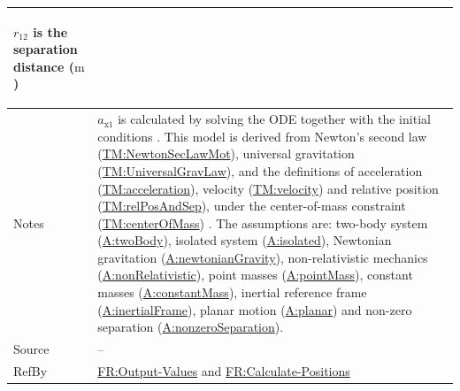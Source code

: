\documentclass[12pt]{article}
\begin{document}
\begin{minipage}{\textwidth}
\begin{tabular}{>{\raggedright}p{}>{\raggedright\arraybackslash}p{}}
\begin{symbDescription}
              \item{${r_{12}}$ is the separation distance (${\text{m}}$)}
              \end{symbDescription}
\\ \midrule
Notes & ${a_{\text{x}1}}$ is calculated by solving the ODE together with the initial conditions . This model is derived from Newton's second law (\hyperref[TM:NewtonSecLawMot]{TM:NewtonSecLawMot}), universal gravitation (\hyperref[TM:UniversalGravLaw]{TM:UniversalGravLaw}), and the definitions of acceleration (\hyperref[TM:acceleration]{TM:acceleration}), velocity (\hyperref[TM:velocity]{TM:velocity}) and relative position (\hyperref[TM:relPosAndSep]{TM:relPosAndSep}), under the center-of-mass constraint (\hyperref[TM:centerOfMass]{TM:centerOfMass}) . The assumptions are: two-body system (\hyperref[twoBody]{A:twoBody}), isolated system (\hyperref[isolated]{A:isolated}), Newtonian gravitation (\hyperref[newtonianGravity]{A:newtonianGravity}), non-relativistic mechanics (\hyperref[nonRelativistic]{A:nonRelativistic}), point masses (\hyperref[pointMass]{A:pointMass}), constant masses (\hyperref[constantMass]{A:constantMass}), inertial reference frame (\hyperref[inertialFrame]{A:inertialFrame}), planar motion (\hyperref[planar]{A:planar}) and non-zero separation (\hyperref[nonzeroSeparation]{A:nonzeroSeparation}).
        
\\ \midrule
Source & --
         
\\ \midrule
RefBy & \hyperref[outputValues]{FR:Output-Values} and \hyperref[calcPositions]{FR:Calculate-Positions}
        
\\ \bottomrule
\end{tabular}
\end{minipage}
\end{document}
